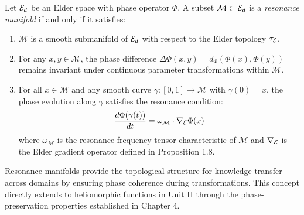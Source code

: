 \begin{definition}
Let $\mathcal{E}_{d}$ be an Elder space with phase operator $\Phi$. A subset $\mathcal{M} \subset \mathcal{E}_{d}$ is a \textit{resonance manifold} if and only if it satisfies:
\begin{enumerate}
    \item $\mathcal{M}$ is a smooth submanifold of $\mathcal{E}_{d}$ with respect to the Elder topology $\tau_{\mathcal{E}_{}}$.
    
    \item For any $x, y \in \mathcal{M}$, the phase difference $\Delta\Phi(x, y) = d_{\Phi}(\Phi(x), \Phi(y))$ remains invariant under continuous parameter transformations within $\mathcal{M}$.
    
    \item For all $x \in \mathcal{M}$ and any smooth curve $\gamma: [0,1] \rightarrow \mathcal{M}$ with $\gamma(0) = x$, the phase evolution along $\gamma$ satisfies the resonance condition:
    \begin{equation}
    \frac{d\Phi(\gamma(t))}{dt} = \omega_{\mathcal{M}} \cdot \nabla_{\mathcal{E}_{}} \Phi(x)
    \end{equation}
    where $\omega_{\mathcal{M}}$ is the resonance frequency tensor characteristic of $\mathcal{M}$ and $\nabla_{\mathcal{E}_{}}$ is the Elder gradient operator defined in Proposition 1.8.
\end{enumerate}
\end{definition}

\begin{remark}
Resonance manifolds provide the topological structure for knowledge transfer across domains by ensuring phase coherence during transformations. This concept directly extends to heliomorphic functions in Unit II through the phase-preservation properties established in Chapter 4.
\end{remark}

